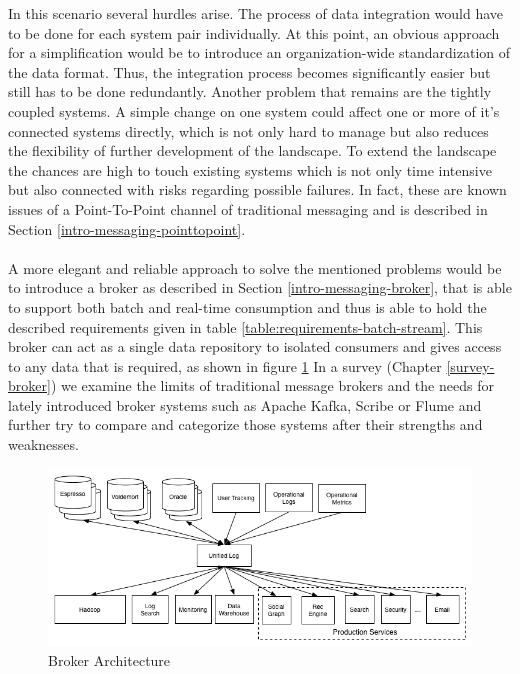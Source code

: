 In this scenario several hurdles arise. The process of data integration would
have to be done for each system pair individually. At this point, an obvious
approach for a simplification would be to introduce an organization-wide
standardization of the data format. Thus, the integration process becomes 
significantly easier but still has to be done redundantly. Another problem that
remains are the tightly coupled systems. A simple change on one system could
affect one or more of it's connected systems directly, which is not only hard to
manage but also reduces the flexibility of further development of the landscape.
To extend the landscape the chances are high to touch existing systems which is
not only time intensive but also connected with risks regarding possible failures. In fact,
these are known issues of a Point-To-Point channel of traditional messaging and
is described in Section \ref{intro-messaging-pointtopoint}.
\\ \\
A more elegant and reliable approach to solve the mentioned problems would be to
introduce a broker as described in Section \ref{intro-messaging-broker}, that is 
able to support both batch and real-time consumption and thus is able to hold
the described requirements given in table \ref{table:requirements-batch-stream}. 
This broker can act as a single data repository to isolated consumers and gives
access to any data that is required, as shown in figure
\ref{fig:datapipeline_simple} In a survey (Chapter \ref{survey-broker}) we examine the limits of
traditional message brokers and the needs for lately introduced broker systems
such as Apache Kafka\cite{apachekafka}, Scribe\cite{scribe} or
Flume\cite{apacheflume} and further try to compare and categorize those
systems after their strengths and weaknesses.

\begin{figure}[H]
    \centering
    \includegraphics[width=1.0\textwidth]{images/datapipeline_simple.png}
    \caption{Broker Architecture}
    \label{fig:datapipeline_simple}
\end{figure}


